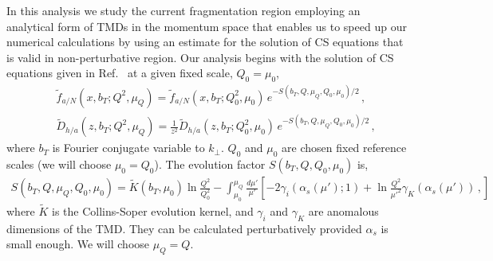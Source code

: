 \documentclass[final,3p,times,onecolumn,sort&compress,hidelinks]{elsarticle}
\begin{document}
 In this analysis we study the  current  fragmentation region employing  an analytical form of TMDs in the momentum space 
 that enables us  to speed up our numerical calculations by using 
 an estimate for the solution of CS equations that is valid in non-perturbative region. Our analysis begins with  the solution of CS equations given in Ref.~\cite{Collins:2014jpa} at a given fixed scale, $Q_0=\mu_0$,
\begin{eqnarray}
&&\tilde f_{a/N} (x,b_T; Q^2, \mu_Q)= \tilde f_{a/N} (x, b_T; Q_0^2, \mu_0)\,e^{-S(b_T, Q, \mu_Q, Q_0, \mu_0)/2}\,,
\label{e:PDF_ansatz}\\[0.3cm]
&&\tilde D_{h/a}(z,b_T; Q^2, \mu_Q)=\frac{1}{z^2}\tilde D_{h/a}(z, b_T; Q_0^2, \mu_0)\,e^{-S(b_T, Q, \mu_Q, Q_0, \mu_0)/2}\,,
\label{e:FF_ansatz0}
\end{eqnarray}
where $b_T$ is Fourier conjugate variable to $k_\perp$.   $Q_0$ and $\mu_0$ are chosen fixed reference scales (we will choose $\mu_0 = Q_0$).
The evolution factor  $S(b_T, Q, Q_0, \mu_0)$  is,
\begin{eqnarray}
S(b_T, Q, \mu_Q, Q_0, \mu_0) = \tilde K(b_T,\mu_0) \ln\frac{Q^2}{Q_0^2} - \int_{\mu_0}^{\mu_Q} \frac{d \mu'}{\mu'}\left[
-2 \gamma_i(\alpha_s(\mu');1) +\ln\frac{Q^2}{\mu'^2}\gamma_K(\alpha_s(\mu'))\,,
 \right]
 \label{e:FF_ansatz}
\end{eqnarray}
where $\tilde K$ is the Collins-Soper evolution kernel,  and
$\gamma_i$ and $\gamma_K$ are anomalous dimensions of the TMD. They  can be calculated perturbatively provided $\alpha_s$ is small enough. We will choose $\mu_Q = Q$. 
\end{document}
